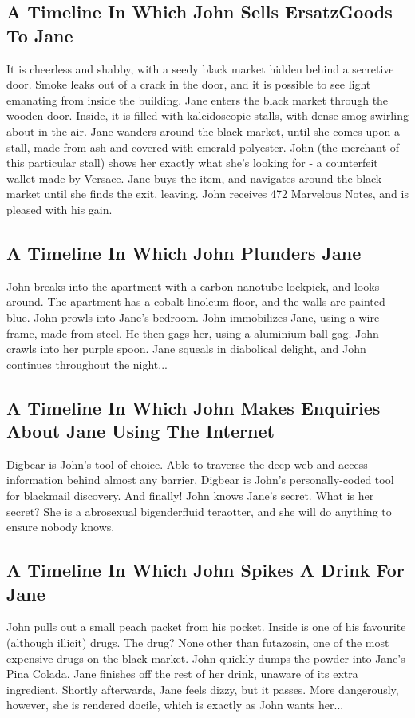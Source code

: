 \documentclass{article}
\begin{document}
\subsection{A Timeline In Which John Sells ErsatzGoods To Jane}


It is cheerless and shabby, with a seedy black market hidden behind a secretive door.
Smoke leaks out of a crack in the door, and it is possible to see light emanating from inside the building.
Jane enters the black market through the wooden door.
Inside, it is filled with kaleidoscopic stalls, with dense smog swirling about in the air.
Jane wanders around the black market, until she comes upon a stall, made from ash and covered with emerald polyester.
John (the merchant of this particular stall) shows her exactly what she's looking for {-} a counterfeit wallet made by Versace.
Jane buys the item, and navigates around the black market until she finds the exit, leaving.
John receives 472 Marvelous Notes, and is pleased with his gain.
\subsection{A Timeline In Which John Plunders Jane}


John breaks into the apartment with a carbon nanotube lockpick, and looks around.
The apartment has a cobalt linoleum floor, and the walls are painted blue.
John prowls into Jane's bedroom.
John immobilizes Jane, using a wire frame, made from steel.
He then gags her, using a aluminium ball{-}gag.
John crawls into her purple spoon.
Jane squeals in diabolical delight, and John continues throughout the night...
\subsection{A Timeline In Which John Makes Enquiries About Jane Using The Internet}


Digbear is John's tool of choice. Able to traverse the deep{-}web and access information behind almost any barrier, Digbear is John's personally{-}coded tool for blackmail discovery.
And finally!
John knows Jane's secret. What is her secret? She is a abrosexual bigenderfluid teraotter, and she will do anything to ensure nobody knows.
\subsection{A Timeline In Which John Spikes A Drink For Jane}


John pulls out a small peach packet from his pocket. Inside is one of his favourite (although illicit) drugs.
The drug? None other than futazosin, one of the most expensive drugs on the black market.
John quickly dumps the powder into Jane's Pina Colada.
Jane finishes off the rest of her drink, unaware of its extra ingredient.
Shortly afterwards, Jane feels dizzy, but it passes.
More dangerously, however, she is rendered docile, which is exactly as John wants her...
\end{document}
